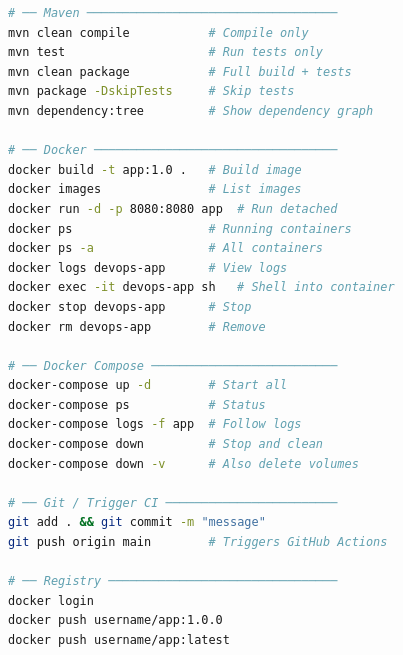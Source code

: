 \documentclass[12pt,a4paper]{report}
\begin{document}
\begin{lstlisting}[language=bash, caption=All Key Commands at a Glance]
# ── Maven ───────────────────────────────────
mvn clean compile           # Compile only
mvn test                    # Run tests only
mvn clean package           # Full build + tests
mvn package -DskipTests     # Skip tests
mvn dependency:tree         # Show dependency graph

# ── Docker ──────────────────────────────────
docker build -t app:1.0 .   # Build image
docker images               # List images
docker run -d -p 8080:8080 app  # Run detached
docker ps                   # Running containers
docker ps -a                # All containers
docker logs devops-app      # View logs
docker exec -it devops-app sh   # Shell into container
docker stop devops-app      # Stop
docker rm devops-app        # Remove

# ── Docker Compose ──────────────────────────
docker-compose up -d        # Start all
docker-compose ps           # Status
docker-compose logs -f app  # Follow logs
docker-compose down         # Stop and clean
docker-compose down -v      # Also delete volumes

# ── Git / Trigger CI ────────────────────────
git add . && git commit -m "message"
git push origin main        # Triggers GitHub Actions

# ── Registry ────────────────────────────────
docker login
docker push username/app:1.0.0
docker push username/app:latest
\end{lstlisting}
\end{document}
